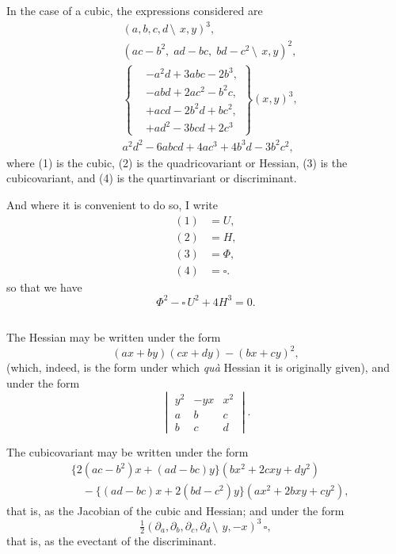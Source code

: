 \documentclass[11pt,a4paper]{book}
\begin{document}
\begin{center}
In the case of a cubic, the expressions considered are
\begin{align}
&(a, b, c, d\,\setminus\!\!\:\, x, y)^3, \tag{1}\\
&(ac - b^2,\; ad - bc,\; bd - c^2\,\setminus\!\!\:\, x, y)^2, \tag{2}\\
&\left\{\begin{aligned}
&-a^2d + 3abc - 2b^3,\\
&-abd + 2ac^2 - b^2c,\\
&+acd - 2b^2d + bc^2,\\
&+ad^2 - 3bcd + 2c^3
\end{aligned}\right\}(x, y)^3, \tag{3}\\
&a^2d^2 - 6abcd + 4ac^3 + 4b^3d - 3b^2c^2, \tag{4}
\end{align}
where (1) is the cubic, (2) is the quadricovariant or Hessian, (3) is the cubicovariant, and (4) is the quartinvariant or discriminant.

And where it is convenient to do so, I write
\begin{align*}
(1) &= U,\\
(2) &= H,\\
(3) &= \Phi,\\
(4) &= \square.
\end{align*}
so that we have
\[
\Phi^2 - \square\,U^2 + 4H^3 = 0.
\]

\subsection{}

The Hessian may be written under the form
\[
(ax + by)(cx + dy) - (bx + cy)^2,
\]
(which, indeed, is the form under which \textit{qu\`a} Hessian it is originally given), and under the form
\[
\begin{vmatrix}
y^2 & -yx & x^2 \\
a & b & c \\
b & c & d
\end{vmatrix}.
\]

The cubicovariant may be written under the form
\begin{align*}
&\{2(ac - b^2)x + (ad - bc)y\}(bx^2 + 2cxy + dy^2)\\
&\quad - \{(ad - bc)x + 2(bd - c^2)y\}(ax^2 + 2bxy + cy^2),
\end{align*}
that is, as the Jacobian of the cubic and Hessian; and under the form
\[
\tfrac{1}{2}(\partial_a, \partial_b, \partial_c, \partial_d\,\setminus\!\!\:\, y, -x)^3\,\square,
\]
that is, as the evectant of the discriminant.


\end{center}
\end{document}
